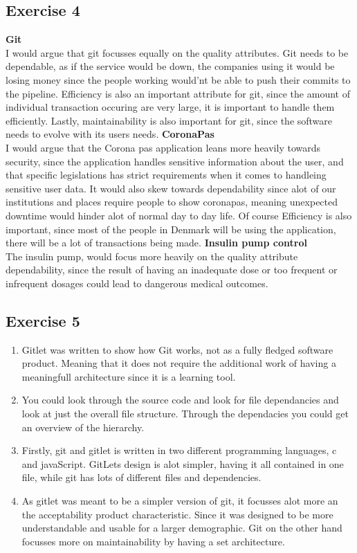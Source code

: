 \documentclass{article}
\begin{document}
\subsection*{Exercise 4}
\textbf{Git} \\
I would argue that git focusses equally on the quality attributes. Git needs to be dependable, as if the service would be down, the companies using it would be losing money since the people working would'nt be able to push their commits to the pipeline. 
Efficiency is also an important attribute for git, since the amount of individual transaction occuring are very large, it is important to handle them efficiently.
Lastly, maintainability is also important for git, since the software needs to evolve with its users needs.
\textbf{CoronaPas} \\
I would argue that the Corona pas application leans more heavily towards security, since the application handles sensitive information about the user, and that specific legislations has strict requirements when it comes to handleing sensitive user data.
It would also skew towards dependability since alot of our institutions and places require people to show coronapas, meaning unexpected downtime would hinder alot of normal day to day life.
Of course Efficiency is also important, since most of the people in Denmark will be using the application, there will be a lot of transactions being made.
\textbf{Insulin pump control} \\
The insulin pump, would focus more heavily on the quality attribute dependability, since the result of having an inadequate dose or too frequent or infrequent dosages could lead to dangerous medical outcomes.
\subsection*{Exercise 5}
\begin{enumerate}
    \item Gitlet was written to show how Git works, not as a fully fledged software product. Meaning that it does not require the additional work of having a meaningfull architecture since it is a learning tool.
    \item You could look through the source code and look for file dependancies and look at just the overall file structure. Through the dependacies you could get an overview of the hierarchy.
    \item Firstly, git and gitlet is written in two different programming languages, c and javaScript. GitLets design is alot simpler, having it all contained in one file, while git has lots of different files and dependencies.
    \item As gitlet was meant to be a simpler version of git, it focusses alot more an the acceptability product characteristic. Since it was designed to be more understandable and usable for a larger demographic. 
    Git on the other hand focusses more on maintainability by having a set architecture.
\end{enumerate}
\end{document}
